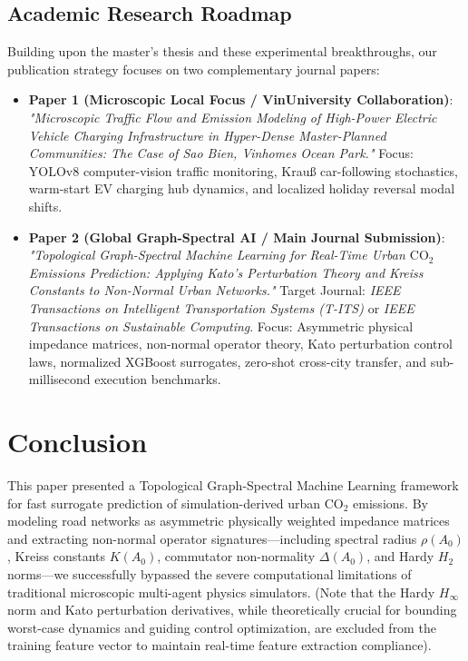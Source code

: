 \documentclass[lettersize,journal]{IEEEtran}
\begin{document}
\subsection{Academic Research Roadmap}
Building upon the master's thesis and these experimental breakthroughs, our publication strategy focuses on two complementary journal papers:
\begin{itemize}
    \item \textbf{Paper 1 (Microscopic Local Focus / VinUniversity Collaboration)}: 
    \textit{"Microscopic Traffic Flow and Emission Modeling of High-Power Electric Vehicle Charging Infrastructure in Hyper-Dense Master-Planned Communities: The Case of Sao Bien, Vinhomes Ocean Park."}
    Focus: YOLOv8 computer-vision traffic monitoring, Krauß car-following stochastics, warm-start EV charging hub dynamics, and localized holiday reversal modal shifts.
    \item \textbf{Paper 2 (Global Graph-Spectral AI / Main Journal Submission)}: 
    \textit{"Topological Graph-Spectral Machine Learning for Real-Time Urban $\text{CO}_2$ Emissions Prediction: Applying Kato's Perturbation Theory and Kreiss Constants to Non-Normal Urban Networks."}
    Target Journal: \emph{IEEE Transactions on Intelligent Transportation Systems (T-ITS)} or \emph{IEEE Transactions on Sustainable Computing}. Focus: Asymmetric physical impedance matrices, non-normal operator theory, Kato perturbation control laws, normalized XGBoost surrogates, zero-shot cross-city transfer, and sub-millisecond execution benchmarks.
\end{itemize}

\section{Conclusion}
This paper presented a Topological Graph-Spectral Machine Learning framework for fast surrogate prediction of simulation-derived urban $\text{CO}_2$ emissions. By modeling road networks as asymmetric physically weighted impedance matrices and extracting non-normal operator signatures—including spectral radius $\rho(A_0)$, Kreiss constants $K(A_0)$, commutator non-normality $\Delta(A_0)$, and Hardy $H_2$ norms—we successfully bypassed the severe computational limitations of traditional microscopic multi-agent physics simulators. (Note that the Hardy $H_\infty$ norm and Kato perturbation derivatives, while theoretically crucial for bounding worst-case dynamics and guiding control optimization, are excluded from the training feature vector to maintain real-time feature extraction compliance). 
\end{document}

